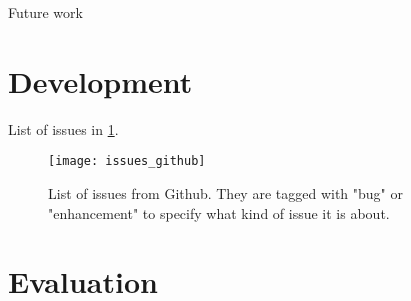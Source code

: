 Future work
\section{Development}
List of issues in \ref{fig:issues}.
\begin{figure}[h!]
    \setlength{\tempheight}{15ex}
    \centering
    \texttt{[image: issues\_github]}
    \caption{List of issues from Github. They are tagged with "bug" or "enhancement" to specify what kind of issue it is about.}
    \label{fig:issues}
\end{figure}

\section{Evaluation}
